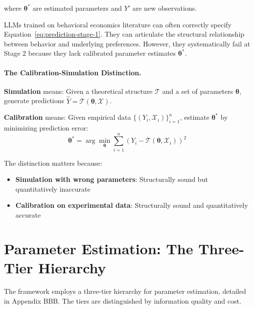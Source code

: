 \documentclass[12pt,oneside]{book}
\begin{document}
where $\boldsymbol{\theta}^*$ are estimated parameters and $Y'$ are new observations.

LLMs trained on behavioral economics literature can often correctly specify Equation~\ref{eq:prediction-stage-1}.
They can articulate the structural relationship between behavior and underlying preferences. However,
they systematically fail at Stage 2 because they lack calibrated parameter estimates $\boldsymbol{\theta}^*$.

\paragraph{The Calibration-Simulation Distinction.}

\begin{tcolorbox}[colback=blue!5!white, colframe=blue!75!black, title=Core Concept: Calibration vs. Simulation]

\textbf{Simulation} means: Given a theoretical structure $\mathcal{T}$ and a set of parameters
$\boldsymbol{\theta}$, generate predictions $\hat{Y} = \mathcal{T}(\boldsymbol{\theta}, \mathcal{X})$.

\textbf{Calibration} means: Given empirical data $\{(Y_i, \mathcal{X}_i)\}_{i=1}^n$, estimate
$\boldsymbol{\theta}^*$ by minimizing prediction error:
\begin{equation}
\boldsymbol{\theta}^* = \arg\min_{\boldsymbol{\theta}} \sum_{i=1}^n (Y_i - \mathcal{T}(\boldsymbol{\theta}, \mathcal{X}_i))^2
\end{equation}

The distinction matters because:
\begin{itemize}
  \item \textbf{Simulation with wrong parameters}: Structurally sound but quantitatively inaccurate
  \item \textbf{Calibration on experimental data}: Structurally sound and quantitatively accurate
\end{itemize}

\end{tcolorbox}

\section{Parameter Estimation: The Three-Tier Hierarchy}

The framework employs a three-tier hierarchy for parameter estimation, detailed in Appendix BBB.
The tiers are distinguished by information quality and cost.
\end{document}

